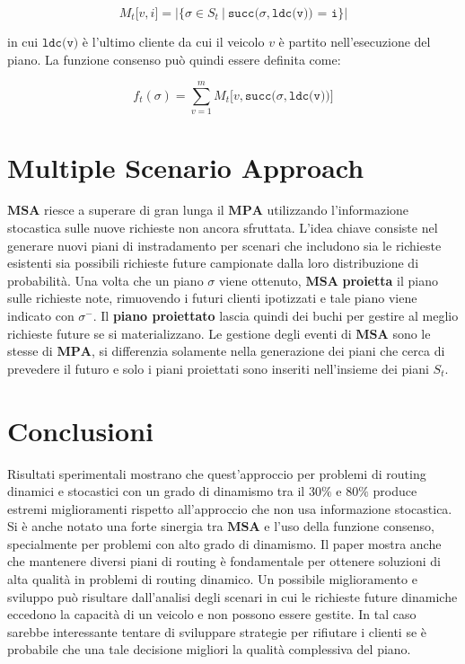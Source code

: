 \documentclass[
]{article}
\begin{document}
\[M_{t}\lbrack v,i\rbrack = |\{\sigma \in S_{t}\ |\ \texttt{succ(}\sigma,\texttt{ldc(v))\ =\ i}\}|\]

in cui {\(\texttt{ldc(v)}\)} è l'ultimo cliente da cui il veicolo
{\(v\)} è partito nell'esecuzione del piano. La funzione consenso può
quindi essere definita come:

\[f_{t}(\sigma) = \sum\limits_{v = 1}^{m}M_{t}\lbrack v,\texttt{succ(}\sigma,\texttt{ldc(v))}\rbrack\]

\hypertarget{multiple-scenario-approach}{%
\section{Multiple Scenario Approach}\label{multiple-scenario-approach}}

{\(\mathbf{MSA}\)} riesce a superare di gran lunga il {\(\mathbf{MPA}\)}
utilizzando l'informazione stocastica sulle nuove richieste non ancora
sfruttata. L'idea chiave consiste nel generare nuovi piani di
instradamento per scenari che includono sia le richieste esistenti sia
possibili richieste future campionate dalla loro distribuzione di
probabilità. Una volta che un piano {\(\sigma\)} viene ottenuto,
{\(\mathbf{MSA}\)} \textbf{proietta} il piano sulle richieste note,
rimuovendo i futuri clienti ipotizzati e tale piano viene indicato con
{\(\sigma^{-}\)}. Il \textbf{piano proiettato} lascia quindi dei buchi
per gestire al meglio richieste future se si materializzano. Le gestione
degli eventi di {\(\mathbf{MSA}\)} sono le stesse di {\(\mathbf{MPA}\)},
si differenzia solamente nella generazione dei piani che cerca di
prevedere il futuro e solo i piani proiettati sono inseriti nell'insieme
dei piani {\(S_{t}\)}.

\hypertarget{conclusioni}{%
\section{Conclusioni}\label{conclusioni}}

Risultati sperimentali mostrano che quest'approccio per problemi di
routing dinamici e stocastici con un grado di dinamismo tra il
{\(30\%\)} e {\(80\%\)} produce estremi miglioramenti rispetto
all'approccio che non usa informazione stocastica. Si è anche notato una
forte sinergia tra {\(\mathbf{MSA}\)} e l'uso della funzione consenso,
specialmente per problemi con alto grado di dinamismo. Il paper mostra
anche che mantenere diversi piani di routing è fondamentale per ottenere
soluzioni di alta qualità in problemi di routing dinamico. Un possibile
miglioramento e sviluppo può risultare dall'analisi degli scenari in cui
le richieste future dinamiche eccedono la capacità di un veicolo e non
possono essere gestite. In tal caso sarebbe interessante tentare di
sviluppare strategie per rifiutare i clienti se è probabile che una tale
decisione migliori la qualità complessiva del piano.
\end{document}
